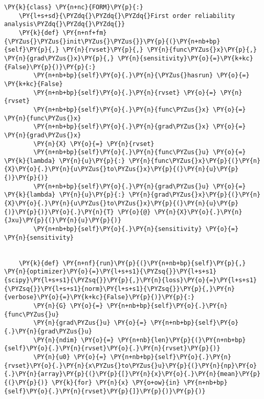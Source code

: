     \begin{tcolorbox}[breakable, size=fbox, boxrule=1pt, pad at break*=1mm,colback=cellbackground, colframe=cellborder]
\begin{Verbatim}[commandchars=\\\{\}]
\PY{k}{class} \PY{n+nc}{FORM}\PY{p}{:}
    \PY{l+s+sd}{\PYZdq{}\PYZdq{}\PYZdq{}First order reliability analysis\PYZdq{}\PYZdq{}\PYZdq{}}
    \PY{k}{def} \PY{n+nf+fm}{\PYZus{}\PYZus{}init\PYZus{}\PYZus{}}\PY{p}{(}\PY{n+nb+bp}{self}\PY{p}{,} \PY{n}{rvset}\PY{p}{,} \PY{n}{func\PYZus{}x}\PY{p}{,} \PY{n}{grad\PYZus{}x}\PY{p}{,} \PY{n}{sensitivity}\PY{o}{=}\PY{k+kc}{False}\PY{p}{)}\PY{p}{:}
        \PY{n+nb+bp}{self}\PY{o}{.}\PY{n}{\PYZus{}hasrun} \PY{o}{=} \PY{k+kc}{False}
        \PY{n+nb+bp}{self}\PY{o}{.}\PY{n}{rvset} \PY{o}{=} \PY{n}{rvset}
        \PY{n+nb+bp}{self}\PY{o}{.}\PY{n}{func\PYZus{}x} \PY{o}{=} \PY{n}{func\PYZus{}x}
        \PY{n+nb+bp}{self}\PY{o}{.}\PY{n}{grad\PYZus{}x} \PY{o}{=} \PY{n}{grad\PYZus{}x}
        \PY{n}{X} \PY{o}{=} \PY{n}{rvset}
        \PY{n+nb+bp}{self}\PY{o}{.}\PY{n}{func\PYZus{}u} \PY{o}{=} \PY{k}{lambda} \PY{n}{u}\PY{p}{:} \PY{n}{func\PYZus{}x}\PY{p}{(}\PY{n}{X}\PY{o}{.}\PY{n}{u\PYZus{}to\PYZus{}x}\PY{p}{(}\PY{n}{u}\PY{p}{)}\PY{p}{)}
        \PY{n+nb+bp}{self}\PY{o}{.}\PY{n}{grad\PYZus{}u} \PY{o}{=} \PY{k}{lambda} \PY{n}{u}\PY{p}{:} \PY{n}{grad\PYZus{}x}\PY{p}{(}\PY{n}{X}\PY{o}{.}\PY{n}{u\PYZus{}to\PYZus{}x}\PY{p}{(}\PY{n}{u}\PY{p}{)}\PY{p}{)}\PY{o}{.}\PY{n}{T} \PY{o}{@} \PY{n}{X}\PY{o}{.}\PY{n}{Jxu}\PY{p}{(}\PY{n}{u}\PY{p}{)}
        \PY{n+nb+bp}{self}\PY{o}{.}\PY{n}{sensitivity} \PY{o}{=} \PY{n}{sensitivity}

    
    \PY{k}{def} \PY{n+nf}{run}\PY{p}{(}\PY{n+nb+bp}{self}\PY{p}{,} \PY{n}{optimizer}\PY{o}{=}\PY{l+s+s1}{\PYZsq{}}\PY{l+s+s1}{scipy}\PY{l+s+s1}{\PYZsq{}}\PY{p}{,}\PY{n}{loss}\PY{o}{=}\PY{l+s+s1}{\PYZsq{}}\PY{l+s+s1}{norm}\PY{l+s+s1}{\PYZsq{}}\PY{p}{,}\PY{n}{verbose}\PY{o}{=}\PY{k+kc}{False}\PY{p}{)}\PY{p}{:}
        \PY{n}{G} \PY{o}{=} \PY{n+nb+bp}{self}\PY{o}{.}\PY{n}{func\PYZus{}u}
        \PY{n}{grad\PYZus{}u} \PY{o}{=} \PY{n+nb+bp}{self}\PY{o}{.}\PY{n}{grad\PYZus{}u}
        \PY{n}{ndim} \PY{o}{=} \PY{n+nb}{len}\PY{p}{(}\PY{n+nb+bp}{self}\PY{o}{.}\PY{n}{rvset}\PY{o}{.}\PY{n}{rvset}\PY{p}{)}
        \PY{n}{u0} \PY{o}{=} \PY{n+nb+bp}{self}\PY{o}{.}\PY{n}{rvset}\PY{o}{.}\PY{n}{x\PYZus{}to\PYZus{}u}\PY{p}{(}\PY{n}{np}\PY{o}{.}\PY{n}{array}\PY{p}{(}\PY{p}{[}\PY{n}{x}\PY{o}{.}\PY{n}{mean}\PY{p}{(}\PY{p}{)} \PY{k}{for} \PY{n}{x} \PY{o+ow}{in} \PY{n+nb+bp}{self}\PY{o}{.}\PY{n}{rvset}\PY{p}{]}\PY{p}{)}\PY{p}{)}
        

\end{Verbatim}
\end{tcolorbox}
